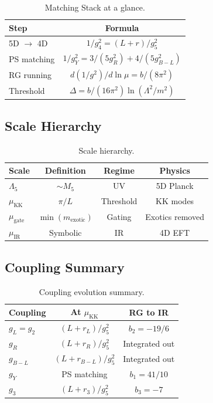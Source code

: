 \documentclass[11pt,a4paper]{article}
\begin{document}
\begin{table}[ht]
\centering
\caption{Matching Stack at a glance.}
\label{tab:matching-summary}
\begin{tabular}{lc}
\toprule
\textbf{Step} & \textbf{Formula} \\
\midrule
5D $\to$ 4D & $1/g_4^2 = (L+r)/g_5^2$ \\
PS matching & $1/g_Y^2 = 3/(5g_R^2) + 4/(5g_{B-L}^2)$ \\
RG running & $d(1/g^2)/d\ln\mu = b/(8\pi^2)$ \\
Threshold & $\Delta = b/(16\pi^2)\ln(\Lambda^2/m^2)$ \\
\bottomrule
\end{tabular}
\end{table}

\subsection{Scale Hierarchy}
\label{app:scale-summary}

\begin{table}[ht]
\centering
\caption{Scale hierarchy.}
\label{tab:scale-hierarchy}
\begin{tabular}{lccc}
\toprule
\textbf{Scale} & \textbf{Definition} & \textbf{Regime} & \textbf{Physics} \\
\midrule
$\Lambda_5$ & $\sim M_5$ & UV & 5D Planck \\
$\mu_{\text{KK}}$ & $\pi/L$ & Threshold & KK modes \\
$\mu_{\text{gate}}$ & $\min(m_{\text{exotic}})$ & Gating & Exotics removed \\
$\mu_{\text{IR}}$ & Symbolic & IR & 4D EFT \\
\bottomrule
\end{tabular}
\end{table}

\subsection{Coupling Summary}
\label{app:coupling-summary}

\begin{table}[ht]
\centering
\caption{Coupling evolution summary.}
\label{tab:coupling-summary}
\begin{tabular}{lcc}
\toprule
\textbf{Coupling} & \textbf{At $\mu_{\text{KK}}$} & \textbf{RG to IR} \\
\midrule
$g_L = g_2$ & $(L+r_L)/g_5^2$ & $b_2 = -19/6$ \\
$g_R$ & $(L+r_R)/g_5^2$ & Integrated out \\
$g_{B-L}$ & $(L+r_{B-L})/g_5^2$ & Integrated out \\
$g_Y$ & PS matching & $b_1 = 41/10$ \\
$g_3$ & $(L+r_3)/g_5^2$ & $b_3 = -7$ \\
\bottomrule
\end{tabular}
\end{table}
\end{document}
